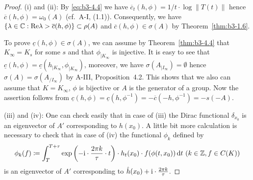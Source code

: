 \begin{proof}	
	(i) and (ii): By \eqref{eq:b3-4.4} we have $\overline{c}_{t}(h,\phi) = 1/t\cdot\log\|T(t)\|$ hence $\overline{c}(h,\phi) = \omega_{0}(A)$ (cf.\ A-I, (1.1)).  
	Consequently, we have $\{\lambda \in \mathbb{C} : \mathop{}\!\mathrm{Re}\lambda > \overline{c}(h,\phi)\} \subset \rho(A)$ and $\overline{c}(h,\phi) \in \sigma(A)$ by Theorem~\ref{thm:b3-1.6}.
	
	To prove $\underline{c}(h,\phi) \in \sigma(A)$, we can assume by Theorem~\ref{thm:b3-4.4} that $K_{\infty} = K_{s}$ for some $s$ and that $\phi_{|K_{\infty}}$ is injective.
	It is easy to see that $\underline{c}(h,\phi) = \underline{c}(h_{|K_{\infty}},\phi_{|K_{\infty}})$, moreover, we have $\sigma(A_{|I_{\infty}}) = \emptyset$ hence $\sigma(A) = \sigma(A_{/I_{\infty}})$ by A-III, Proposition~4.2.
	This shows that we also can assume that $K = K_{\infty}$, \ie $\phi$ is bijective or $A$ is the generator of a group.
	Now the assertion follows from $\underline{c}(h,\phi) = \underline{c}(h,\phi^{-1}) = -\overline{c}(-h,\phi^{-1}) = -s(-A)$.
	
	(iii) and (iv): One can check easily that in case of (iii) the Dirac functional $\delta_{x_{0}}$ is an eigenvector of $A'$ corresponding to $h(x_{0})$.
    A little bit more calculation is necessary to check that in case of (iv) the functional $\phi_{k}$ defined by
\[
	\phi_{k}(f) \coloneq \int_{T}^{T+\tau} \exp\left(-\mathrm{i}\cdot\frac{2\pi k}{\tau}\cdot t\right)\cdot h_{t}(x_{0})\cdot f(\phi(t,x_{0})) \mathop{}\!\mathrm{d}{t}  \ (k \in \mathbb{Z}, f \in C(K))
\]
    is an eigenvector of $A'$ corresponding to $\hat{h}(x_{0}) + \mathrm{i}\cdot\frac{2\pi k}{\tau}$.


\end{proof}
